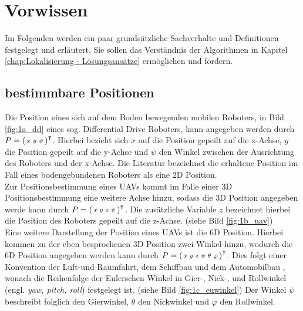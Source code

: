 \clearpage
\chapter{\textbf{Vorwissen}}\label{chap:Vorwissen}
Im Folgenden werden ein paar grundsätzliche Sachverhalte und Definitionen festgelegt und erläutert. Sie sollen das Verständnis der Algorithmen in Kapitel \ref{chap:Lokalisierung - Lösungsansätze} ermöglichen und fördern. 


\section{bestimmbare Positionen}\label{sec:bestimmbare Positionen}
Die Position eines sich auf dem Boden bewegenden mobilen Roboters, in Bild \ref{fig:1a_dd}  eines sog. Differential Drive Roboters, kann angegeben werden durch 
$P=\mathbf{\begin{psmallmatrix}
x & y & \psi
\end{psmallmatrix}}^\intercal$.
Hierbei bezieht sich $x$ auf die Position gepeilt auf die x-Achse, $y$ die Position gepeilt auf die y-Achse und $\psi$  den Winkel zwischen der Ausrichtung des Roboters und der x-Achse. Die Literatur bezeichnet die erhaltene Position im Fall eines bodengebundenen Roboters als eine 2D Position.\\
Zur Positionsbestimmung eines UAVs kommt im Falle einer 3D Positionsbestimmung eine weitere Achse hinzu, sodass die 3D Position angegeben werde kann durch
$P=\mathbf{\begin{psmallmatrix}
x & y & z & \psi
\end{psmallmatrix}}^\intercal$.
Die zusätzliche Variable $z$ bezeichnet hierbei die Position des Roboters gepeilt auf die z-Achse. (siehe Bild \ref{fig:1b_uav})\\
Eine weitere Darstellung der Position eines UAVs ist die 6D Position. Hierbei kommen zu der eben besprochenen 3D Position zwei Winkel hinzu, wodurch die 6D Position angegeben werden kann durch
$P=\mathbf{\begin{psmallmatrix}
x & y & z & \psi & \theta & \varphi
\end{psmallmatrix}}^\intercal$.
Dies folgt einer Konvention der Luft-und Raumfahrt, dem Schiffbau und dem Automobilbau \cite{website:cosmos-indirekt}, wonach die Reihenfolge der Eulerschen Winkel in Gier-, Nick-, und Rollwinkel (engl. \textit{yaw, pitch, roll}) festgelegt ist. (siehe Bild \ref{fig:1c_euwinkel}) Der Winkel $\psi$ beschreibt folglich den Gierwinkel, $\theta$ den Nickwinkel und $\varphi$ den Rollwinkel.\\

